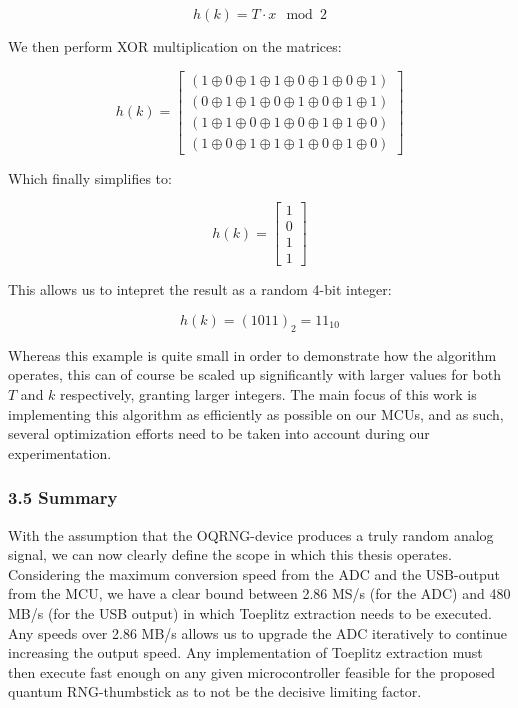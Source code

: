 \documentclass{sigchi}
\begin{document}
\[
h(k) = T \cdot x \mod 2
\]

\phantom{TEMP LINEBREAK}

We then perform XOR multiplication on the matrices:

\[
h(k) =
\begin{bmatrix}
(1 \oplus 0 \oplus 1 \oplus 1 \oplus 0 \oplus 1 \oplus 0 \oplus 1) \\
(0 \oplus 1 \oplus 1 \oplus 0 \oplus 1 \oplus 0 \oplus 1 \oplus 1) \\
(1 \oplus 1 \oplus 0 \oplus 1 \oplus 0 \oplus 1 \oplus 1 \oplus 0) \\
(1 \oplus 0 \oplus 1 \oplus 1 \oplus 1 \oplus 0 \oplus 1 \oplus 0)
\end{bmatrix}
\]

Which finally simplifies to:

\[
h(k) =
\begin{bmatrix}
1 \\
0 \\
1 \\
1
\end{bmatrix}
\]

This allows us to intepret the result as a random 4-bit integer:

\[
h(k) = (1011)_2 = 11_{10}
\]

Whereas this example is quite small in order to demonstrate how the algorithm operates, this can of course be scaled up significantly with larger values for both \(T\) and \(k\) respectively, granting larger integers. The main focus of this work is implementing this algorithm as efficiently as possible on our MCUs, and as such, several optimization efforts need to be taken into account during our experimentation.

\subsubsection{3.5 Summary}\label{summary}

With the assumption that the OQRNG-device produces a truly random analog signal, we can now clearly define the scope in which this thesis operates. Considering the maximum conversion speed from the ADC and the USB-output from the MCU, we have a clear bound between 2.86 MS/s (for the ADC) and 480 MB/s (for the USB output) in which Toeplitz extraction needs to be executed. Any speeds over 2.86 MB/s allows us to upgrade the ADC iteratively to continue increasing the output speed. Any implementation of Toeplitz extraction must then execute fast enough on any given microcontroller feasible for the proposed quantum RNG-thumbstick as to not be the decisive limiting factor.
\end{document}
